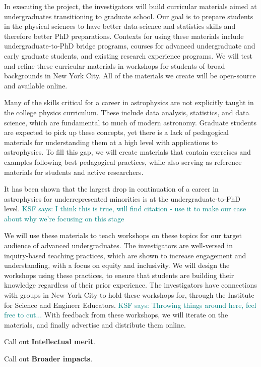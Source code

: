 \documentclass[12pt, fullpage, letterpaper]{article}
\newcommand{\KSF}[1]{\textcolor{teal}{KSF says: #1}}
\begin{document}
In executing the project, the investigators will build curricular
materials aimed at undergraduates transitioning to graduate school.
Our goal is to prepare students
in the physical sciences to have better data-science and statistics
skills and therefore better PhD preparations.
Contexts for using these materials include undergraduate-to-PhD bridge programs, courses for advanced undergraduate and early graduate students, and existing research experience programs. 
We will test and refine these curricular materials in workshops for
students of broad backgrounds in New York City.
All of the materials we create will be open-source and available online. 

Many of the skills critical for a career in astrophysics are not explicitly taught in the college physics curriculum. 
These include data analysis, statistics, and data science, which are fundamental to much of modern astronomy.
Graduate students are expected to pick up these concepts, yet there is a lack of pedagogical materials for understanding them at a high level with applications to astrophysics.
To fill this gap, we will create materials that contain exercises and examples following best pedagogical practices, while also serving as reference materials for students and active researchers.

It has been shown that the largest drop in continuation of a career in astrophysics for underrepresented minorities is at the undergraduate-to-PhD level. \KSF{I think this is true, will find citation - use it to make our case about why we're focusing on this stage}

We will use these materials to teach workshops on these topics for our target audience of advanced undergraduates.
The investigators are well-versed in inquiry-based teaching practices, which are shown to increase engagement and understanding, with a focus on equity and inclusivity.
We will design the workshops using these practices, to ensure that students are building their knowledge regardless of their prior experience.
The investigators have connections with groups in New York City to hold these workshops for, through the Institute for Science and Engineer Educators. \KSF{Throwing things around here, feel free to cut...}
With feedback from these workshops, we will iterate on the materials, and finally advertise and distribute them online. 

Call out \textbf{Intellectual merit}.

Call out \textbf{Broader impacts}.
\end{document}
